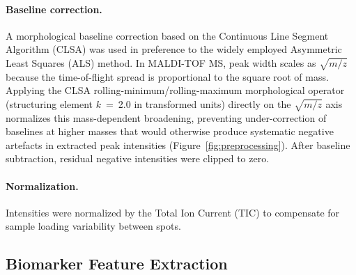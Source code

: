 \documentclass[journal=ancham, manuscript=article, layout=traditional]{achemso}
\begin{document}
\paragraph{Baseline correction.}
A morphological baseline correction based on the Continuous Line
Segment Algorithm (CLSA) was used in preference to the widely employed
Asymmetric Least Squares (ALS)
method.\cite{Eilers2005ALS, Sauve2004CLSA}
In MALDI-TOF MS, peak width scales as $\sqrt{m/z}$ because the
time-of-flight spread is proportional to the square root of
mass.\cite{Gross2004MS}
Applying the CLSA rolling-minimum/rolling-maximum morphological
operator (structuring element $k$~=~2.0 in transformed units)
directly on the $\sqrt{m/z}$ axis normalizes this mass-dependent
broadening, preventing under-correction of baselines at higher masses
that would otherwise produce systematic negative artefacts in
extracted peak intensities (Figure~\ref{fig:preprocessing}).
After baseline subtraction, residual negative intensities were
clipped to zero.

\paragraph{Normalization.}
Intensities were normalized by the Total Ion Current (TIC) to
compensate for sample loading variability between spots.

\subsection{Biomarker Feature Extraction}
\end{document}
